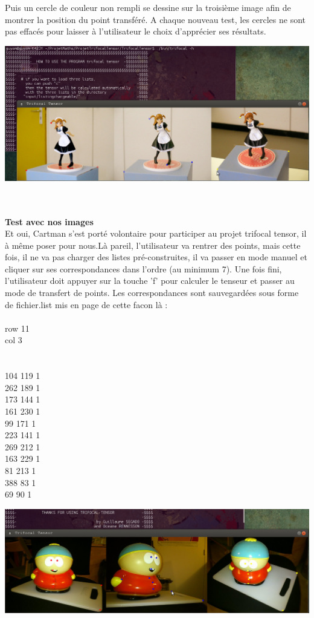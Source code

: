 \documentclass[a4paper,11pt,fleqn]{report}
\begin{document}
	Puis un cercle de couleur non rempli se dessine sur la troisi\`eme image afin de montrer la position du point transf\'er\'e. A chaque nouveau test, les cercles ne sont pas effac\'es pour laisser \`a l'utilisateur le choix d'appr\'ecier ses r\'esultats.
	\begin{center}\includegraphics[scale=0.50]{./capture4.png}\end{center}\\\\
	\textbf{Test avec nos images}\\
	Et oui, Cartman s'est port\'e volontaire pour participer au projet trifocal tensor, il \`a m\^eme poser pour nous.L\`a pareil, l'utilisateur va rentrer des points, mais cette fois, il ne va pas charger des listes pr\'e-construites, il va passer en mode manuel et cliquer sur ses correspondances dans l'ordre (au minimum 7). Une fois fini, l'utilisateur doit appuyer sur la touche 'f' pour calculer le tenseur et passer au mode de transfert de points. Les correspondances sont sauvegard\'ees sous forme de fichier.list mis en page de cette facon l\`a :\\\\
row 11\\
col 3\\
 \\\\
104 119   1\\
262 189   1\\
173 144   1\\
161 230   1\\
 99 171   1\\
223 141   1\\
269 212   1\\
163 229   1\\
 81 213   1\\
388  83   1\\
 69  90   1\\
	\begin{center}\includegraphics[scale=0.50]{./cartman1.png}\end{center}\\
\end{document}
